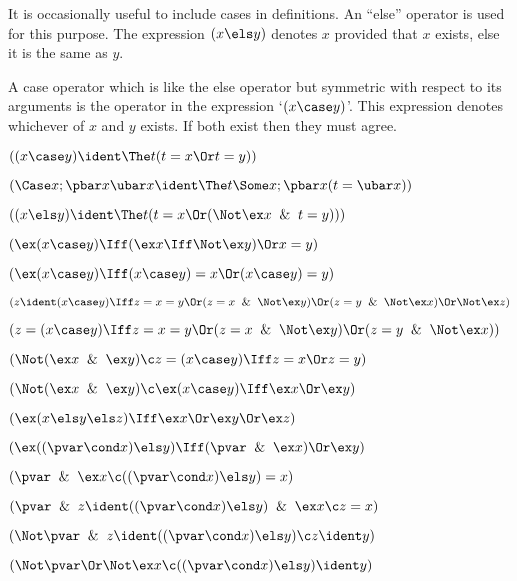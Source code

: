 It is occasionally useful to include cases in definitions.  An ``else''
operator is used for this purpose.  The expression $(x \els y)$ denotes
$x$ provided that $x$ exists,  else it is the same as $y$. 

 A case operator which is like the else operator but symmetric with respect
to its arguments is the operator in the expression `$(x \case y)$'.  This
expression denotes whichever of $x$ and $y$ exists.  If both exist then they
must agree. 
\lineb


 $((x \case y) \ident \The t (t = x \Or t = y))$

 $(\Case x;\pbar x \ubar x \ident \The t \Some x;\pbar x(t = \ubar x))$


 $((x \els y) \ident \The t (t = x \Or (\Not \ex x \And t = y)))$

\lineb


 $(\ex(x \case y) \Iff (\ex x \Iff \Not \ex y)\Or x = y)$

 $(\ex(x \case y) \Iff (x \case y)= x \Or (x \case y)= y)$

 $(z\ident (x\case y) \Iff z = x = y \Or (z = x \And \Not\ex y
) \Or (z = y \And \Not \ex x) \Or \Not \ex z)$

 $(z = (x\case y) \Iff z = x = y \Or (z = x \And \Not\ex y
) \Or (z = y \And \Not \ex x) )$

 $(\Not(\ex x \And \ex y) \c z = (x\case y) \Iff z = x \Or z = y)$

 $(\Not(\ex x \And \ex y) \c \ex (x\case y) \Iff \ex x \Or \ex y)$

 $(\ex(x \els y \els z) \Iff \ex x \Or \ex y \Or \ex z)$

 $(\ex ((\pvar \cond x) \els y) \Iff (\pvar \And \ex x) \Or \ex y)$

 $(\pvar \And \ex x \c ((\pvar \cond x )\els y) = x)$

 $(\pvar \And z \ident ((\pvar \cond x )\els y) \And \ex x \c z = x)$

 $(\Not \pvar \And z \ident ((\pvar \cond x )\els y) \c z \ident y)$

 $(\Not \pvar \Or \Not \ex x \c ((\pvar \cond x) \els y) \ident y)$

